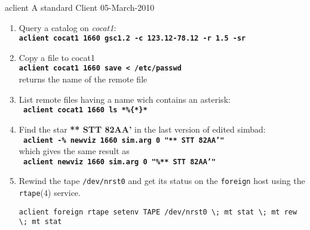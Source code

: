 \begin{manpage}{1}{aclient} {A standard Client} {05-March-2010}
\begin{enumerate}
\item	Query a catalog on {\em cocat1}:\\
	{\tt\bf{}aclient cocat1 1660 gsc1.2  -c 123.12-78.12 -r 1.5 -sr}
\item	Copy a file to cocat1\\
	{\tt\bf{}aclient cocat1 1660 save < /etc/passwd} \\
	returns the name of the remote file
\item	List remote files having a name wich contains an asterisk: \\
	{\tt\bf{} aclient cocat1 1660 ls *\%\{*\}*}
\item	Find the star {\bf{}* STT 82AA'} in the last
	version of edited simbad: \\
	{\tt\bf{} aclient -\% newviz 1660 sim.arg 0 "** STT 82AA'"} \\
	which gives the same result as \\
	{\tt\bf{} aclient newviz 1660 sim.arg 0 "\%{** STT 82AA'}"}
\item	Rewind the tape {\tt/dev/nrst0} and get its status on the
	{\tt foreign} host using the {\tt rtape}(4) service.
\begin{verbatim}
aclient foreign rtape setenv TAPE /dev/nrst0 \; mt stat \; mt rew \; mt stat
\end{verbatim}
\end{enumerate}
	
\end{manpage}
